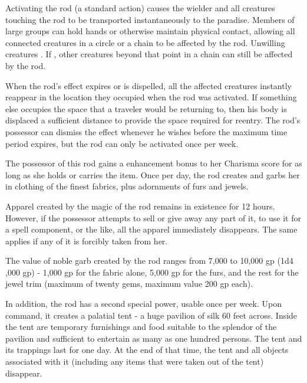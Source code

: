 Activating the rod (a standard action) causes the wielder and all creatures touching the rod to be transported instantaneously to the paradise. Members of large groups can hold hands or otherwise maintain physical contact, allowing all connected creatures in a circle or a chain to be affected by the rod. Unwilling creatures . If , other creatures beyond that point in a chain can still be affected by the rod.

When the rod's effect expires or is dispelled, all the affected creatures instantly reappear in the location they occupied when the rod was activated. If something else occupies the space that a traveler would be returning to, then his body is displaced a sufficient distance to provide the space required for reentry. The rod's possessor can dismiss the effect whenever he wishes before the maximum time period expires, but the rod can only be activated once per week.


 The possessor of this rod gains a  enhancement bonus to her Charisma score for as long as she holds or carries the item. Once per day, the rod creates and garbs her in clothing of the finest fabrics, plus adornments of furs and jewels.

Apparel created by the magic of the rod remains in existence for 12 hours. However, if the possessor attempts to sell or give away any part of it, to use it for a spell component, or the like, all the apparel immediately disappears. The same applies if any of it is forcibly taken from her.

The value of noble garb created by the rod ranges from 7,000 to 10,000 gp (1d4 ,000 gp) - 1,000 gp for the fabric alone, 5,000 gp for the furs, and the rest for the jewel trim (maximum of twenty gems, maximum value 200 gp each).

In addition, the rod has a second special power, usable once per week. Upon command, it creates a palatial tent - a huge pavilion of silk 60 feet across. Inside the tent are temporary furnishings and food suitable to the splendor of the pavilion and sufficient to entertain as many as one hundred persons. The tent and its trappings last for one day. At the end of that time, the tent and all objects associated with it (including any items that were taken out of the tent) disappear.


